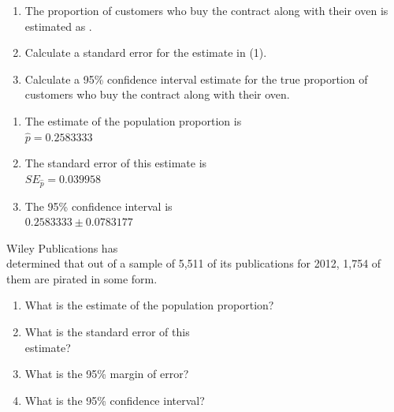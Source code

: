 \documentclass[11pt, chapterprefix=true]{scrbook}\usepackage[]{graphicx}\usepackage[]{color}
\begin{document}
\begin{exercises}
\begin{exercise}
\begin{enumerate}
\item	The proportion of customers who buy the contract along with their oven is estimated as \underline{\phantom{xxxxxxxxxx}}.
\item	Calculate a standard error for the estimate in (1).
\item	Calculate a 95\% confidence interval estimate for the true proportion of customers who buy the contract along with their oven.
\end{enumerate}
\end{exercise}
\begin{solution} %


\begin{enumerate}
\item	The estimate of the population proportion is \\ $\hat{p} = 0.2583333$
\item	The standard error of this estimate is \\ $SE_{\hat{p}} = 0.039958$
\item	The 95\% confidence interval is \\ $0.2583333 \pm 0.0783177$
\end{enumerate}
\end{solution}

\begin{exercise} %

Wiley Publications has \\ determined that out of a sample of 5,511 of its publications for 2012, 1,754 of them are pirated in some form.

\begin{enumerate}
\item	What is the estimate of the population proportion?
\item	What is the standard error of this \\ estimate?
\item	What is the 95\% margin of error?
\item	What is the 95\% confidence interval?
\end{enumerate}
\end{exercise}
%


\end{exercises}
\end{document}
